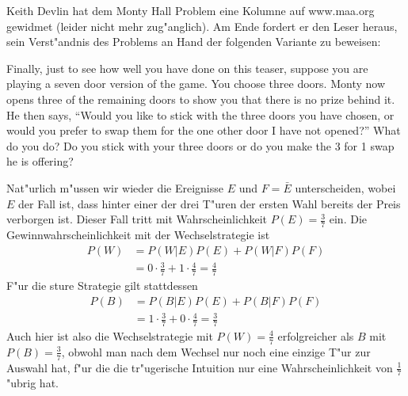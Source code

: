 Keith Devlin hat dem Monty Hall Problem eine Kolumne auf www.maa.org
gewidmet (leider nicht mehr zug"anglich). Am Ende
fordert er den Leser heraus, sein Verst"andnis des Problems an
Hand der folgenden Variante zu beweisen:
\medskip

Finally, just to see how well you have done on this teaser, suppose
you are playing a seven door version of the game. You choose three
doors. Monty now opens three of the remaining doors to show you
that there is no prize behind it. He then says, ``Would you like to
stick with the three doors you have chosen, or would you prefer to
swap them for the one other door I have not opened?'' What do you
do? Do you stick with your three doors or do you make the 3 for 1
swap he is offering?

\begin{loesung}
Nat"urlich m"ussen wir wieder die Ereignisse $E$ und $F=\bar E$ unterscheiden,
wobei $E$ der Fall ist, dass hinter einer der drei T"uren der ersten Wahl
bereits der Preis verborgen ist.  Dieser Fall tritt mit Wahrscheinlichkeit
$P(E)=\frac37$ ein.
Die Gewinnwahrscheinlichkeit mit der Wechselstrategie ist
\begin{align*}
P(W)&=P(W|E)P(E)+P(W|F)P(F)\\
&=0\cdot \frac37+1\cdot\frac47=\frac47
\end{align*}
F"ur die sture Strategie gilt stattdessen
\begin{align*}
P(B)&=P(B|E)P(E)+P(B|F)P(F)\\
&=1\cdot \frac37+0\cdot\frac47=\frac37
\end{align*}
Auch hier ist also die Wechselstrategie mit $P(W)=\frac47$
erfolgreicher als $B$ mit $P(B)=\frac37$, obwohl man
nach dem Wechsel nur noch eine einzige T"ur zur Auswahl hat, f"ur
die die tr"ugerische Intuition nur eine Wahrscheinlichkeit von
$\frac17$ "ubrig hat.
\end{loesung}

